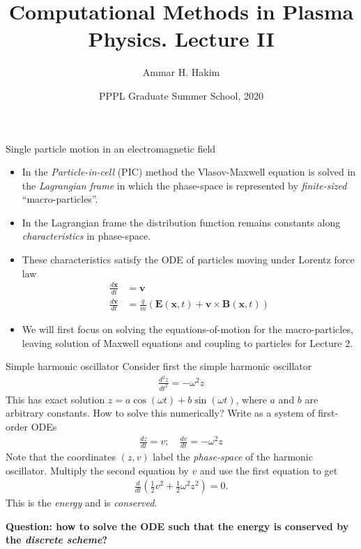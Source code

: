 \documentclass[pdf]{beamer}
\title[{\tt }] {Computational Methods in Plasma Physics. Lecture II}%
\author[http://cmpp.rtfd.io]%
{Ammar H. Hakim\inst{1}}%
\institute[PPPL]
{ \inst{1} Princeton Plasma Physics Laboratory, Princeton, NJ %
}
\date[8/11/2020]{PPPL Graduate Summer School, 2020}
\newcommand{\mvec}[1]{\mathbf{#1}}
\theoremstyle{definition}
\begin{document}
\begin{frame}
  \titlepage
\end{frame}

\begin{frame}{Single particle motion in an electromagnetic field}
  \small%
  \begin{itemize}
  \item In the \emph{Particle-in-cell} (PIC) method the Vlasov-Maxwell
    equation is solved in the \emph{Lagrangian frame} in which the
    phase-space is represented by \emph{finite-sized}
    ``macro-particles''.
  \item In the Lagrangian frame the distribution
    function remains constants along \emph{characteristics} in
    phase-space.
  \item These characteristics satisfy the ODE of particles moving
    under Lorentz force law
    \begin{align*}
      \frac{d\mvec{x}}{dt} &= \mvec{v} \\
      \frac{d\mvec{v}}{dt} &= \frac{q}{m}(\mvec{E}(\mvec{x},t) + \mvec{v}\times\mvec{B}(\mvec{x},t))
    \end{align*}
  \item We will first focus on solving the equations-of-motion for
    the macro-particles, leaving solution of Maxwell equations and
    coupling to particles for Lecture 2.
  \end{itemize}
\end{frame}

\begin{frame}{Simple harmonic oscillator}
  \small%
  Consider first the simple harmonic oscillator
  \begin{align*}
    \frac{d^2z}{dt^2} = -\omega^2 z
  \end{align*}
  This has exact solution $z = a\cos(\omega t) + b\sin(\omega t)$,
  where $a$ and $b$ are arbitrary constants. How to solve this
  numerically? Write as a system of first-order ODEs
  \begin{align*}
    \frac{dz}{dt} = v; \quad \frac{dv}{dt} = -\omega^2 z
  \end{align*}
  Note that the coordinates $(z,v)$ label the \emph{phase-space} of
  the harmonic oscillator. Multiply the second equation by $v$ and use
  the first equation to get
  \begin{align*}
    \frac{d}{dt}\left(\frac{1}{2} v^2 + \frac{1}{2}\omega^2 z^2\right) = 0.
  \end{align*}
  This is the \emph{energy} and is \emph{conserved}.%
  
  \bf{Question: how to solve the ODE such that the energy is conserved
    by the \emph{discrete scheme}?}
\end{frame}
\end{document}
